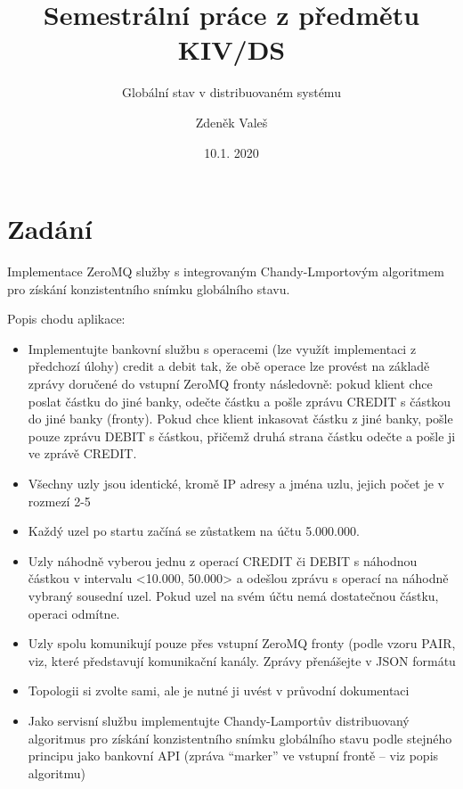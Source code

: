 \documentclass[11pt,a4paper]{scrartcl}
\begin{document}
	\title{Semestrální práce z předmětu KIV/DS}
	\subtitle{Globální stav v distribuovaném systému}
	\author{Zdeněk Valeš}
	\date{10.1. 2020}
	\maketitle
	\newpage
	
	\section{Zadání}
	Implementace ZeroMQ služby s integrovaným Chandy-Lmportovým algoritmem pro získání konzistentního snímku globálního stavu.
	
	Popis chodu aplikace:
	\begin{itemize}
		\item Implementujte bankovní službu s operacemi (lze využít implementaci z předchozí úlohy) credit a debit tak, že obě operace lze provést na základě zprávy doručené do vstupní ZeroMQ fronty následovně: pokud klient chce poslat částku do jiné banky, odečte částku a pošle zprávu CREDIT s částkou do jiné banky (fronty). Pokud chce klient inkasovat částku z jiné banky, pošle pouze zprávu DEBIT s částkou, přičemž druhá strana částku odečte a pošle ji ve zprávě CREDIT.

		\item Všechny uzly jsou identické, kromě IP adresy a jména uzlu, jejich počet je v rozmezí 2-5
		
		\item Každý uzel po startu začíná se zůstatkem na účtu 5.000.000.

		\item Uzly náhodně vyberou jednu z operací CREDIT či DEBIT s náhodnou částkou v intervalu <10.000, 50.000> a
		odešlou zprávu s operací na náhodně vybraný sousední uzel. Pokud uzel na svém účtu nemá dostatečnou
		částku, operaci odmítne.
		
		\item Uzly spolu komunikují pouze přes vstupní ZeroMQ fronty (podle vzoru PAIR, viz, které představují komunikační kanály. Zprávy
		přenášejte v JSON formátu
		
		\item Topologii si zvolte sami, ale je nutné ji uvést v průvodní dokumentaci
		
		\item Jako servisní službu implementujte Chandy-Lamportův distribuovaný algoritmus pro získání konzistentního snímku globálního stavu podle stejného principu jako bankovní API (zpráva “marker” ve vstupní frontě – viz popis algoritmu)


\end{itemize}
\end{document}
